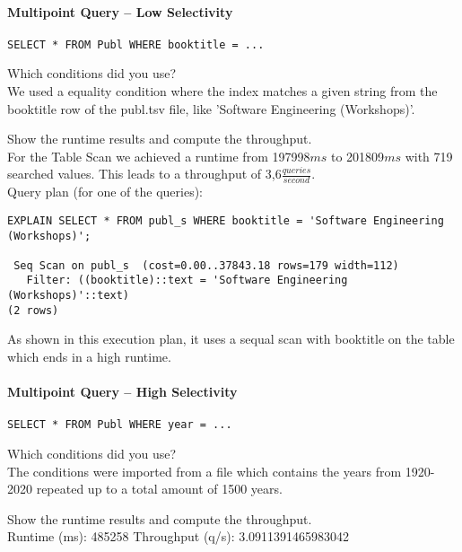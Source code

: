 \documentclass[11pt]{scrartcl}
\begin{document}
\paragraph{Multipoint Query -- Low Selectivity}

{\small
\begin{verbatim}
SELECT * FROM Publ WHERE booktitle = ...
\end{verbatim}
}

\noindent
Which conditions did you use?\\
We used a equality condition where the index matches a given string from the booktitle row of the publ.tsv file, like 'Software Engineering (Workshops)'.

\smallskip\noindent
Show the runtime results and compute the throughput.\\
For the Table Scan we achieved a runtime from 197998$ms$ to 201809$ms$ with 719 searched values.
This leads to a throughput of 3,6$\frac{queries}{second}$.\\

\smallskip\noindent
Query plan (for one of the queries):
\begin{verbatim}
EXPLAIN SELECT * FROM publ_s WHERE booktitle = 'Software Engineering (Workshops)';

 Seq Scan on publ_s  (cost=0.00..37843.18 rows=179 width=112)
   Filter: ((booktitle)::text = 'Software Engineering (Workshops)'::text)
(2 rows)
\end{verbatim}

As shown in this execution plan, it uses a sequal scan with booktitle on the table which ends in a high runtime.


\paragraph{Multipoint Query -- High Selectivity}

{\small
\begin{verbatim}
SELECT * FROM Publ WHERE year = ...
\end{verbatim}
}

\noindent
Which conditions did you use?\\
The conditions were imported from a file which contains the years from 1920-2020 repeated up to a total amount of 1500 years.

\smallskip\noindent
Show the runtime results and compute the throughput.\\
Runtime (ms): 485258
Throughput (q/s): 3.0911391465983042
\end{document}
